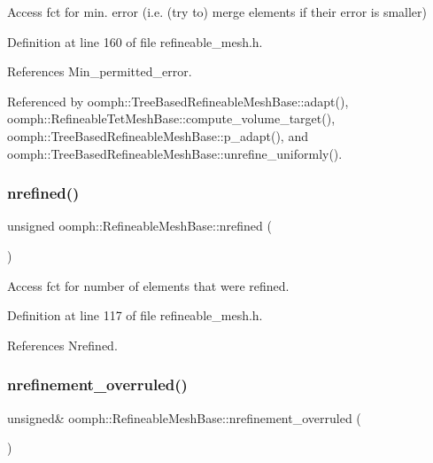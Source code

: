 Access fct for min. error (i.\+e. (try to) merge elements if their error is smaller) 



Definition at line 160 of file refineable\+\_\+mesh.\+h.



References Min\+\_\+permitted\+\_\+error.



Referenced by oomph\+::\+Tree\+Based\+Refineable\+Mesh\+Base\+::adapt(), oomph\+::\+Refineable\+Tet\+Mesh\+Base\+::compute\+\_\+volume\+\_\+target(), oomph\+::\+Tree\+Based\+Refineable\+Mesh\+Base\+::p\+\_\+adapt(), and oomph\+::\+Tree\+Based\+Refineable\+Mesh\+Base\+::unrefine\+\_\+uniformly().

\mbox{\label{classoomph_1_1RefineableMeshBase_abc1285956019d530610a3d9e0ff770e8}} 
\subsubsection{\texorpdfstring{nrefined()}{nrefined()}}
{\footnotesize\ttfamily unsigned oomph\+::\+Refineable\+Mesh\+Base\+::nrefined (\begin{DoxyParamCaption}{ }\end{DoxyParamCaption})\hspace{0.3cm}{\ttfamily [inline]}}



Access fct for number of elements that were refined. 



Definition at line 117 of file refineable\+\_\+mesh.\+h.



References Nrefined.

\mbox{\label{classoomph_1_1RefineableMeshBase_af189058782c7217f6d29a6f9555e7c3d}} 
\subsubsection{\texorpdfstring{nrefinement\+\_\+overruled()}{nrefinement\_overruled()}}
{\footnotesize\ttfamily unsigned\& oomph\+::\+Refineable\+Mesh\+Base\+::nrefinement\+\_\+overruled (\begin{DoxyParamCaption}{ }\end{DoxyParamCaption})\hspace{0.3cm}{\ttfamily [inline]}}




